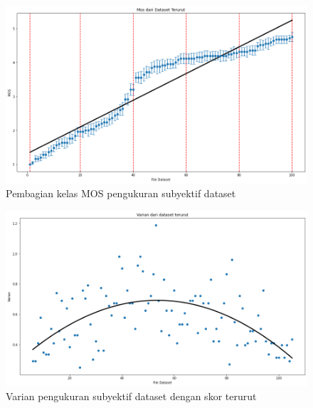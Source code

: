 \begin{figure}[H]
	\vspace{-0.1cm}
	\begin{center}
		\includegraphics[width=1\columnwidth]{bab4/Gambar/sort-tes.png}
	\end{center}
	\vspace{-0.2cm}
	\caption{Pembagian kelas MOS pengukuran subyektif dataset }
	\label{sort-tes}
\end{figure}

\begin{figure}[H]
	\vspace{-0.1cm}
	\begin{center}
		\includegraphics[width=1\columnwidth]{bab4/Gambar/var-tes.png}
	\end{center}
	\vspace{-0.2cm}
	\caption{Varian pengukuran subyektif dataset dengan skor terurut}
	\label{var-tes}
\end{figure}

